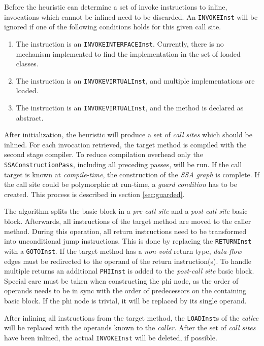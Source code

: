 \documentclass[draft, final]{vutinfth} %
\begin{document}
Before the heuristic can determine a set of invoke instructions to inline, invocations which cannot be inlined need to be discarded. An \texttt{INVOKEInst} will be ignored if one of the following conditions holds for this given call site.

\begin{enumerate}
    \item The instruction is an \texttt{INVOKEINTERFACEInst}. Currently, there is no mechanism implemented to find the implementation in the set of loaded classes.
    \item The instruction is an \texttt{INVOKEVIRTUALInst}, and multiple implementations are loaded.
    \item The instruction is an \texttt{INVOKEVIRTUALInst}, and the method is declared as abstract.
\end{enumerate}

After initialization, the heuristic will produce a set of \emph{call sites} which should be inlined. For each invocation retrieved, the target method is compiled with the second stage compiler. To reduce compilation overhead only the \texttt{SSAConstructionPass}, including all preceding passes, will be run. If the call target is known at \emph{compile-time}, the construction of the \emph{SSA graph} is complete. If the call site could be polymorphic at run-time, a \emph{guard condition} has to be created. This process is described in section \ref{sec:guarded}.

The algorithm splits the basic block in a \emph{pre-call site} and a \emph{post-call site} basic block. Afterwards, all instructions of the target method are moved to the caller method. During this operation, all return instructions need to be transformed into unconditional jump instructions. This is done by replacing the \texttt{RETURNInst} with a \texttt{GOTOInst}. If the target method has a \emph{non-void} return type, \emph{data-flow} edges must be redirected to the operand of the return instruction(s). To handle multiple returns an additional \texttt{PHIInst} is added to the \emph{post-call site} basic block. Special care must be taken when constructing the phi node, as the order of operands needs to be in sync with the order of predecessors on the containing basic block. If the phi node is trivial, it will be replaced by its single operand.

After inlining all instructions from the target method, the \texttt{LOADInst}s of the \emph{callee} will be replaced with the operands known to the \emph{caller}. After the set of \emph{call sites} have been inlined, the actual \texttt{INVOKEInst} will be deleted, if possible.
\end{document}
